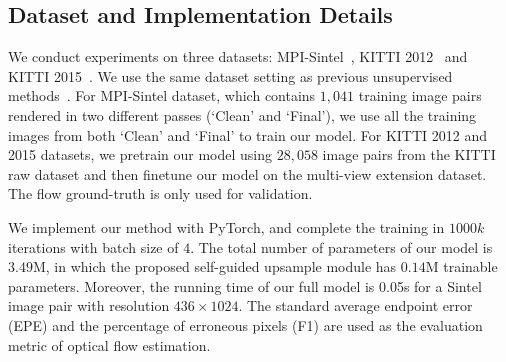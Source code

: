 \documentclass[final]{cvpr}
\begin{document}
\subsection{Dataset and Implementation Details}\label{sec:Datasets}
We conduct experiments on three datasets: MPI-Sintel~\cite{Butler2012}, KITTI 2012~\cite{KITTI_2012} and KITTI 2015~\cite{KITTI_2015}. We use the same dataset setting as previous unsupervised methods~\cite{liu2020learning,jonschkowski2020matters}. 
For MPI-Sintel dataset, which contains $1,041$ training image pairs rendered in two different passes (`Clean' and `Final'), we use all the training images from both `Clean' and `Final' to train our model. For KITTI 2012 and 2015 datasets, we pretrain our model using $28,058$ image pairs from the KITTI raw dataset and then finetune our model on the multi-view extension dataset. The flow ground-truth is only used for validation. 


We implement our method with PyTorch, and complete the training in $1000k$ iterations with batch size of $4$. The total number of parameters of our model is $3.49\text{M}$, in which the proposed self-guided upsample module has $0.14\text{M}$ trainable parameters. Moreover, the running time of our full model is 0.05s for a Sintel image pair with resolution $436\times 1024$.
The standard average endpoint error (EPE) and the percentage of erroneous pixels (F1) are used as the evaluation metric of optical flow estimation.
\end{document}
